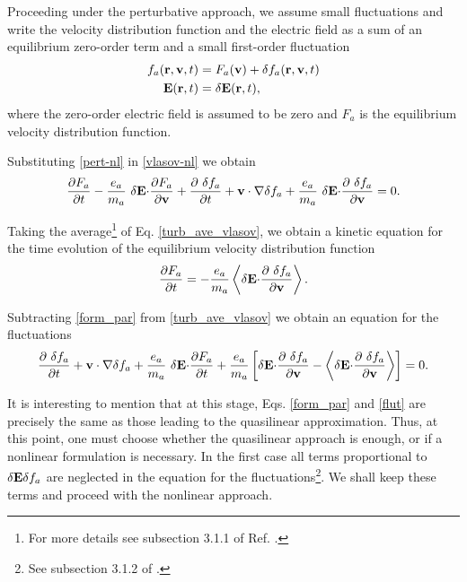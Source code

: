 \documentclass[12pt,a4paper,ruledheader]{report}
\begin{document}
Proceeding under the perturbative approach, we assume small
fluctuations and write the velocity distribution function
and the electric field as a sum of an equilibrium zero-order
term and a small first-order fluctuation
\begin{equation}
  \label{pert-nl}
  \begin{split}
      f_a({\bf r}, {\bf v},t)&=F_a({\bf v})+\delta f_a({\bf r}, {\bf v},t)\\
  {\bf E}({\bf r},t)&=\delta {\bf E}({\bf r},t),
  \end{split}
\end{equation}
where the zero-order electric field is assumed to be zero and
$F_a$ is the equilibrium velocity distribution function.

Substituting \eqref{pert-nl} in \eqref{vlasov-nl} we obtain
\begin{equation} 
  \frac{\partial F_a}{\partial t}-\frac{e_a}{m_a}\
  \delta {\bf E \cdot} \frac{\partial F_a}{\partial \bf v}
+\frac{\partial\ \delta f_a}{\partial t}+{\bf v \cdot \nabla} \delta f_a
  +\frac{e_a}{m_a}\ \delta {\bf E \cdot}
  \frac{\partial\ \delta f_a}{\partial \bf v}=0.
\label{turb_ave_vlasov}
\end{equation}

Taking the average\footnote{For more details see subsection 3.1.1
  of Ref. \cite{Tigik2015}.} of Eq. \eqref{turb_ave_vlasov}, we
obtain a kinetic equation for the time evolution of the equilibrium
velocity distribution function
\begin{equation}
\frac{\partial F_a}{\partial t}
=-\frac{e_a}{m_a}\left< \delta {\bf E \cdot}
\frac{\partial\ \delta f_a}{\partial \bf v}\right>.
\label{form_par}
\end{equation}

Subtracting \eqref{form_par} from \eqref{turb_ave_vlasov} we obtain
an equation for the fluctuations
\begin{equation}
\frac{\partial\ \delta f_a}{\partial t}+{\bf v \cdot \nabla} \delta f_a
+\frac{e_a}{m_a}\ \delta {\bf E \cdot} \frac{\partial F_a}{\partial t}
+\frac{e_a}{m_a}\left[\delta {\bf E \cdot} \frac{\partial\ \delta f_a}{\partial \bf v}
-\left< \delta {\bf E \cdot}
\frac{\partial\ \delta f_a}{\partial \bf v}\right>\right]=0.
\label{flut}
\end{equation}

It is interesting to mention that at this stage, Eqs. \eqref{form_par}
and \eqref{flut} are precisely the same as those leading to the
quasilinear approximation.
Thus, at this point, one must choose whether the quasilinear approach
is enough, or if a nonlinear formulation is necessary. In the first case
all terms proportional to $\delta {\bf E} \delta f_a$ are neglected in
the equation for the fluctuations\footnote{See subsection 3.1.2 of
  \cite{Tigik2015}.}. We shall keep these terms and proceed with the
nonlinear approach.
\end{document}
